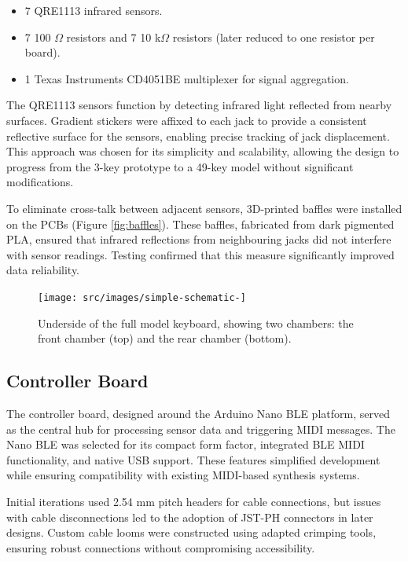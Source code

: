\begin{itemize}
    \item 7 QRE1113 infrared sensors.
    \item 7 100 $\Omega$ resistors and 7 10 k$\Omega$ resistors (later reduced to one resistor per board).
    \item 1 Texas Instruments CD4051BE multiplexer for signal aggregation.
\end{itemize}

The QRE1113 sensors function by detecting infrared light reflected from nearby surfaces. Gradient stickers were affixed to each jack to provide a consistent reflective surface for the sensors, enabling precise tracking of jack displacement. This approach was chosen for its simplicity and scalability, allowing the design to progress from the 3-key prototype to a 49-key model without significant modifications.

To eliminate cross-talk between adjacent sensors, 3D-printed baffles were installed on the PCBs (Figure \ref{fig:baffles}). These baffles, fabricated from dark pigmented PLA, ensured that infrared reflections from neighbouring jacks did not interfere with sensor readings. Testing confirmed that this measure significantly improved data reliability.

\begin{figure}  
  \centering
  \texttt{[image: src/images/simple-schematic-]} 
  \caption{Underside of the full model keyboard, showing two chambers: the front chamber (top) and the rear chamber (bottom).} 
  \Description{} 
  \label{fig:simple-schematic}
\end{figure}

\subsection{Controller Board}\label{controller-board}

The controller board, designed around the Arduino Nano BLE platform, served as the central hub for processing sensor data and triggering MIDI messages. The Nano BLE was selected for its compact form factor, integrated BLE MIDI functionality, and native USB support. These features simplified development while ensuring compatibility with existing MIDI-based synthesis systems.

Initial iterations used 2.54 mm pitch headers for cable connections, but issues with cable disconnections led to the adoption of JST-PH connectors in later designs. Custom cable looms were constructed using adapted crimping tools, ensuring robust connections without compromising accessibility.

